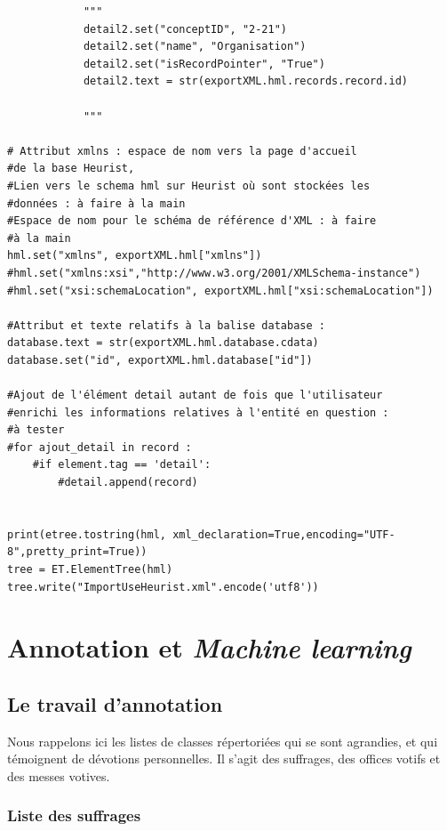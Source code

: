 \documentclass[a4paper,12pt,twoside]{book}
\begin{document}
\begin{verbatim}
            """
            detail2.set("conceptID", "2-21")
            detail2.set("name", "Organisation")
            detail2.set("isRecordPointer", "True")
            detail2.text = str(exportXML.hml.records.record.id)

            """

# Attribut xmlns : espace de nom vers la page d'accueil 
#de la base Heurist,
#Lien vers le schema hml sur Heurist où sont stockées les
#données : à faire à la main
#Espace de nom pour le schéma de référence d'XML : à faire 
#à la main
hml.set("xmlns", exportXML.hml["xmlns"])
#hml.set("xmlns:xsi","http://www.w3.org/2001/XMLSchema-instance")
#hml.set("xsi:schemaLocation", exportXML.hml["xsi:schemaLocation"])

#Attribut et texte relatifs à la balise database :
database.text = str(exportXML.hml.database.cdata)
database.set("id", exportXML.hml.database["id"])

#Ajout de l'élément detail autant de fois que l'utilisateur 
#enrichi les informations relatives à l'entité en question : 
#à tester
#for ajout_detail in record :
	#if element.tag == 'detail':
		#detail.append(record)


print(etree.tostring(hml, xml_declaration=True,encoding="UTF-8",pretty_print=True))
tree = ET.ElementTree(hml)
tree.write("ImportUseHeurist.xml".encode('utf8'))
    \end{verbatim}

	
	\chapter{Annotation et \textit{Machine learning}}
	
	\section{\label{annotation}Le travail d'annotation}
	
	Nous rappelons ici les listes de classes répertoriées qui se sont agrandies, et qui témoignent de dévotions personnelles. Il s'agit des suffrages, des offices votifs et des messes votives. 
	
	\subsection{Liste des suffrages}
	
\end{document}
